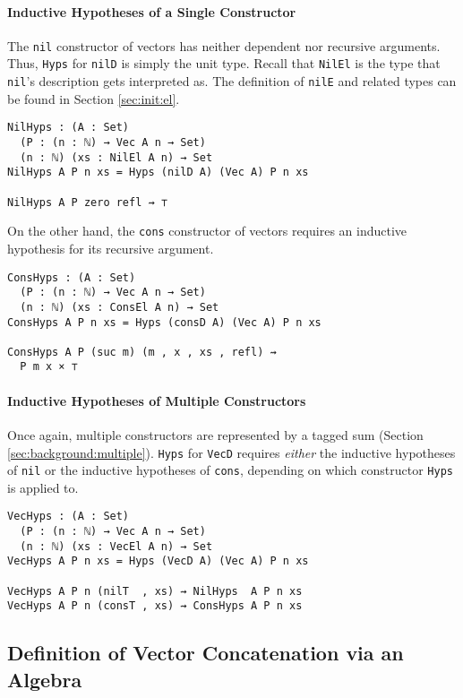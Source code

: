 \documentclass[preprint,nonatbib]{sigplanconf}
\newcommand{\refsec}[1]{Section \ref{sec:#1}}
\begin{document}
\paragraph{Inductive Hypotheses of a Single Constructor}

The {\tt nil} constructor of vectors has neither dependent nor
recursive arguments. Thus, {\tt Hyps} for {\tt nilD} is simply
the unit type. Recall that {\tt NilEl} is the type that
{\tt nil}'s description gets interpreted as. The definition of
{\tt nilE} and related types can be found in \refsec{init:el}.

\begin{verbatim}
NilHyps : (A : Set)
  (P : (n : ℕ) → Vec A n → Set)
  (n : ℕ) (xs : NilEl A n) → Set
NilHyps A P n xs = Hyps (nilD A) (Vec A) P n xs

NilHyps A P zero refl ⇝ ⊤
\end{verbatim}

On the other hand, the {\tt cons} constructor of vectors requires an
inductive hypothesis for its recursive argument.

\begin{verbatim}
ConsHyps : (A : Set)
  (P : (n : ℕ) → Vec A n → Set)
  (n : ℕ) (xs : ConsEl A n) → Set
ConsHyps A P n xs = Hyps (consD A) (Vec A) P n xs

ConsHyps A P (suc m) (m , x , xs , refl) ⇝
  P m x × ⊤
\end{verbatim}

\paragraph{Inductive Hypotheses of Multiple Constructors}

Once again, multiple constructors are represented by a tagged
sum (\refsec{background:multiple}). {\tt Hyps} for
{\tt VecD} requires {\it either} the inductive hypotheses of
{\tt nil} or the inductive hypotheses of {\tt cons}, depending on
which constructor {\tt Hyps} is applied to.

\begin{verbatim}
VecHyps : (A : Set)
  (P : (n : ℕ) → Vec A n → Set)
  (n : ℕ) (xs : VecEl A n) → Set
VecHyps A P n xs = Hyps (VecD A) (Vec A) P n xs

VecHyps A P n (nilT  , xs) ⇝ NilHyps  A P n xs 
VecHyps A P n (consT , xs) ⇝ ConsHyps A P n xs 
\end{verbatim}

\subsection{Definition of Vector Concatenation via an Algebra}
\end{document}
